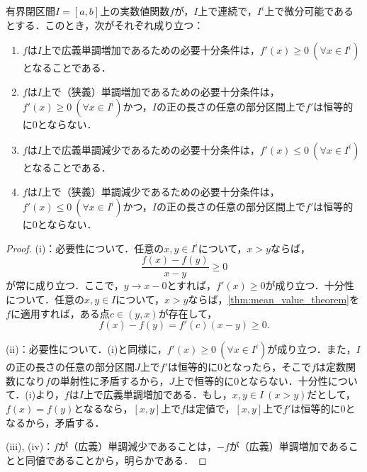 \documentclass[a4paper,10pt]{ltjsarticle}
\begin{document}
\begin{MyTheorem}
  有界閉区間\(I = [a, b]\)上の実数値関数\(f\)が，\(I\)上で連続で，\(I^i\)上で微分可能であるとする．このとき，次がそれぞれ成り立つ：
  \begin{enumerate}
    \item \(f\)は\(I\)上で広義単調増加であるための必要十分条件は，\(f'(x) \ge 0 \ (\forall x \in I^i)\)となることである．
    \item \(f\)は\(I\)上で（狭義）単調増加であるための必要十分条件は，\(f'(x) \ge 0 \ (\forall x \in I^i)\)かつ，\(I\)の正の長さの任意の部分区間上で\(f'\)は恒等的に\(0\)とならない．
    \item \(f\)は\(I\)上で広義単調減少であるための必要十分条件は，\(f'(x) \le 0 \ (\forall x \in I^i)\)となることである．
    \item \(f\)は\(I\)上で（狭義）単調減少であるための必要十分条件は，\(f'(x) \le 0 \ (\forall x \in I^i)\)かつ，\(I\)の正の長さの任意の部分区間上で\(f'\)は恒等的に\(0\)とならない．
  \end{enumerate}
\end{MyTheorem}
\begin{proof}
  (i)：必要性について．任意の\(x, y \in I^i\)について，\(x > y\)ならば，
  \[ \frac{f(x) - f(y)}{x - y} \ge 0  \]
  が常に成り立つ．ここで，\(y \to x-0\)とすれば，\(f'(x) \ge 0\)が成り立つ．十分性について．任意の\(x, y \in I\)について，\(x > y\)ならば，\cref{thm:mean_value_theorem}を\(f\)に適用すれば，ある点\(c \in (y, x)\)が存在して，
  \[ f(x) - f(y) = f'(c)(x - y) \ge 0. \]

  (ii)：必要性について．(i)と同様に，\(f'(x) \ge 0 \ (\forall x \in I^i)\)が成り立つ．また，\(I\)の正の長さの任意の部分区間\(J\)上で\(f'\)は恒等的に\(0\)となったら，そこで\(f\)は定数関数になり\(f\)の単射性に矛盾するから，\(J\)上で恒等的に\(0\)とならない．十分性について．(i)より，\(f\)は\(I\)上で広義単調増加である．もし，\(x, y \in I\ (x > y)\)だとして，\(f(x) = f(y)\)となるなら，\([x, y]\)上で\(f\)は定値で，\([x, y]\)上で\(f'\)は恒等的に\(0\)となるから，矛盾する．

  (iii), (iv)：\(f\)が（広義）単調減少であることは，\(-f\)が（広義）単調増加であることと同値であることから，明らかである．
\end{proof}
\end{document}
